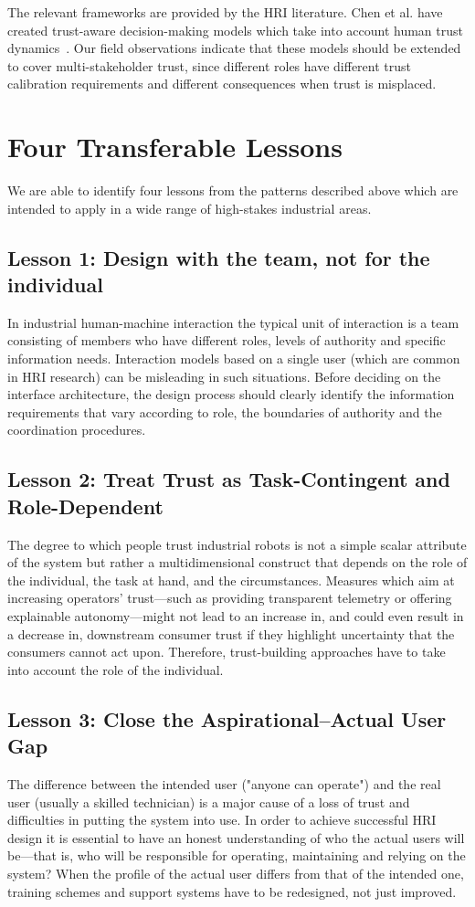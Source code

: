 \documentclass[sigconf, nonacm] {acmart}
\begin{document}
The relevant frameworks are provided by the HRI literature. Chen et al. have created trust-aware decision-making models which take into account human trust dynamics~\cite{chen2018trustawaredecisionmakinghumanrobot}. Our field observations indicate that these models should be extended to cover multi-stakeholder trust, since different roles have different trust calibration requirements and different consequences when trust is misplaced.

\section{Four Transferable Lessons}
We are able to identify four lessons from the patterns described above which are intended to apply in a wide range of high-stakes industrial areas.

\subsection{Lesson 1: Design with the team, not for the individual}
In industrial human-machine interaction the typical unit of interaction is a team consisting of members who have different roles, levels of authority and specific information needs. Interaction models based on a single user (which are common in HRI research) can be misleading in such situations. Before deciding on the interface architecture, the design process should clearly identify the information requirements that vary according to role, the boundaries of authority and the coordination procedures.

\subsection{Lesson 2: Treat Trust as Task-Contingent and Role-Dependent}
The degree to which people trust industrial robots is not a simple scalar attribute of the system but rather a multidimensional construct that depends on the role of the individual, the task at hand, and the circumstances. Measures which aim at increasing operators' trust—such as providing transparent telemetry or offering explainable autonomy—might not lead to an increase in, and could even result in a decrease in, downstream consumer trust if they highlight uncertainty that the consumers cannot act upon. Therefore, trust-building approaches have to take into account the role of the individual.

\subsection{Lesson 3: Close the Aspirational--Actual User Gap}
The difference between the intended user ("anyone can operate") and the real user (usually a skilled technician) is a major cause of a loss of trust and difficulties in putting the system into use. In order to achieve successful HRI design it is essential to have an honest understanding of who the actual users will be—that is, who will be responsible for operating, maintaining and relying on the system? When the profile of the actual user differs from that of the intended one, training schemes and support systems have to be redesigned, not just improved.
\end{document}
